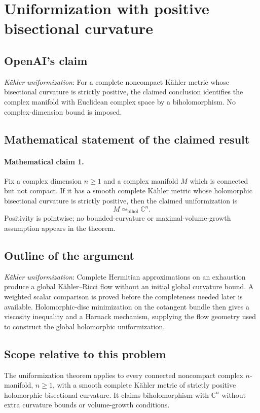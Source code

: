 \documentclass[11pt]{article}
\begin{document}
\section*{Uniformization with positive bisectional curvature}

\subsection{OpenAI's claim}
\textit{Kähler uniformization}: For a complete noncompact Kähler metric whose bisectional curvature is strictly positive, the claimed conclusion identifies the complex manifold with Euclidean complex space by a biholomorphism. No complex-dimension bound is imposed.

\subsection{Mathematical statement of the claimed result}
\paragraph{Mathematical claim 1.} Fix a complex dimension $n\ge1$ and a complex manifold $M$ which is connected but not compact. If it has a smooth complete K\"ahler metric whose holomorphic bisectional curvature is strictly positive, then the claimed uniformization is \[M\simeq_{\mathrm{bihol}}\mathbb C^n.\] Positivity is pointwise; no bounded-curvature or maximal-volume-growth assumption appears in the theorem.

\subsection{Outline of the argument}
\textit{Kähler uniformization}: Complete Hermitian approximations on an exhaustion produce a global Kähler--Ricci flow without an initial global curvature bound. A weighted scalar comparison is proved before the completeness needed later is available. Holomorphic-disc minimization on the cotangent bundle then gives a viscosity inequality and a Harnack mechanism, supplying the flow geometry used to construct the global holomorphic uniformization.

\subsection{Scope relative to this problem}
The uniformization theorem applies to every connected noncompact complex $n$-manifold, $n\ge1$, with a smooth complete K\"ahler metric of strictly positive holomorphic bisectional curvature. It claims biholomorphism with $\mathbb C^n$ without extra curvature bounds or volume-growth conditions.
\end{document}
